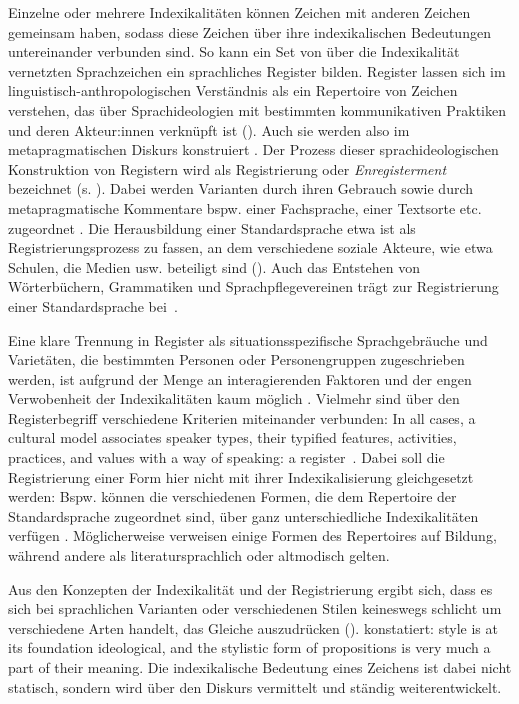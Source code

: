 Einzelne oder mehrere Indexikalitäten können Zeichen mit anderen Zeichen gemeinsam haben, sodass diese Zeichen über ihre indexikalischen Bedeutungen untereinander verbunden sind. 
So kann ein Set von über die Indexikalität vernetzten Sprachzeichen ein sprachliches Register bilden. 
Register lassen sich im linguistisch-anthropologischen Verständnis als ein Repertoire von Zeichen verstehen, das über Sprachideologien mit bestimmten kommunikativen Praktiken und deren Akteur:innen verknüpft ist (\cites[s.][216]{Agha.1999}[38]{Agha2005}). 
Auch sie werden also im metapragmatischen Diskurs konstruiert \citep[s.][46]{Agha2005}. 
Der Prozess dieser sprachideologischen Konstruktion von Registern wird als Registrierung oder \textit{Enregisterment} bezeichnet (s. \cites[231]{Agha2003}[268]{Spitzmuller2013}{Anderwald.2017}). 
Dabei werden Varianten durch ihren Gebrauch sowie durch metapragmatische Kommentare bspw. einer Fachsprache, einer Textsorte etc. zugeordnet \citep[s.][218]{Agha.1999}. 
Die Herausbildung einer Standardsprache etwa ist als Registrierungsprozess zu fassen, an dem verschiedene soziale Akteure, wie etwa Schulen, die Medien usw. beteiligt sind (\cites[s.][64]{Woolard1994}{Auer.2013}). 
Auch das Entstehen von W{\"o}rterb{\"u}chern, Grammatiken und Sprachpflegevereinen tr{\"a}gt zur Registrierung einer Standardsprache bei~\citep[s.][164]{Gal.2006b}.

\begin{sloppypar}
Eine klare Trennung in Register als situationsspezifische Sprachgebr{\"a}uche und Variet{\"a}ten, die bestimmten Personen oder Personengruppen zugeschrieben werden, ist aufgrund der Menge an interagierenden Faktoren und der engen Verwobenheit der Indexikalit{\"a}ten kaum m{\"o}glich \citep[s.][120--121]{Eckert2005}. Vielmehr sind über den Registerbegriff verschiedene Kriterien miteinander verbunden: {\glqq}In all cases, a cultural model associates speaker types, their typified features, activities, practices, and values with a way of speaking: a register{\grqq}~\citep[117]{Gal.2016}. 
Dabei soll die Registrierung einer Form hier nicht mit ihrer Indexikalisierung gleichgesetzt werden:
Bspw. können die verschiedenen Formen, die dem Repertoire der Standardsprache zugeordnet sind, über ganz unterschiedliche Indexikalitäten verfügen \citep[s.][122]{Eckert2005}. 
Möglicherweise verweisen einige Formen des Repertoires auf Bildung, während andere als literatursprachlich oder altmodisch gelten.
\end{sloppypar}

Aus den Konzepten der Indexikalität und der Registrierung ergibt sich, dass es sich bei sprachlichen Varianten oder verschiedenen Stilen keineswegs schlicht um verschiedene Arten handelt, das Gleiche auszudrücken (\cites[s.][28]{Auer.1989}[88]{Coupland.2007}). 
\citet[96]{Eckert2012} konstatiert: \glqq style is at its foundation ideological, and the stylistic form of propositions is very much a part of their meaning\grqq.
Die indexikalische Bedeutung eines Zeichens ist dabei nicht statisch, sondern wird über den Diskurs vermittelt und ständig weiterentwickelt. 
